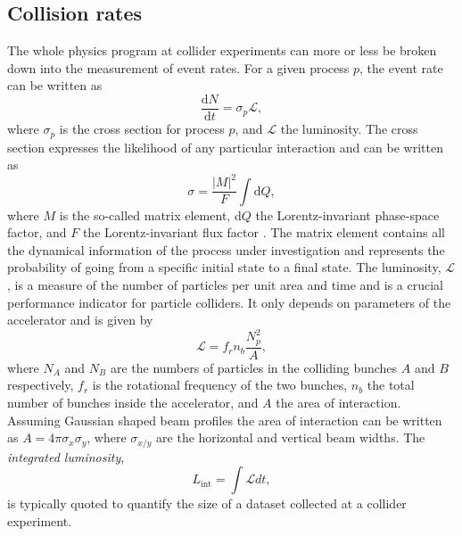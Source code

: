 \subsection{Collision rates}
\label{subsec:collision-rates}
The whole physics program at collider experiments can more or less be broken down into the measurement of event rates. 
For a given process $p$, the event rate can be written as
\begin{equation}
  \frac{\mathrm{d}N}{\mathrm{d}t} = \sigma_p \mathcal{L},
\end{equation}
where $\sigma_p$ is the cross section for process $p$, and $\mathcal{L}$ the luminosity.
The cross section expresses the likelihood of any particular interaction and can be written as
\begin{equation}
  \label{eq:xsec}
  \sigma = \frac{|M|^2}{F} \int \text{d}Q,
\end{equation}
where $M$ is the so-called matrix element, d$Q$ the Lorentz-invariant phase-space factor, and $F$ the Lorentz-invariant flux factor \cite{Halzen:1984mc}. 
The matrix element contains all the dynamical information of the process under investigation and represents the probability of going from a specific initial state to a final state. 
The luminosity, $\mathcal{L}$, is a measure of the number of particles per unit area and time and is a crucial performance indicator for particle colliders. It only depends on parameters of the accelerator and is given by
\begin{equation}
  \mathcal{L} = f_rn_b\frac{N_p^2}{A},
\end{equation}
where $N_A$ and $N_B$ are the numbers of particles in the colliding bunches $A$ and $B$ respectively, $f_r$ is the rotational frequency of the two bunches, $n_b$ the total number of bunches inside the accelerator, and $A$ the area of interaction. Assuming Gaussian shaped beam profiles the area of interaction can be written as $A = 4\pi \sigma_x \sigma_y$, where $\sigma_{x/y}$ are the horizontal and vertical beam widths.
The \emph{integrated luminosity}, 
\begin{equation}
  L_\text{int} = \int \mathcal{L} dt,
\end{equation}
is typically quoted to quantify the size of a dataset collected at a collider experiment.


